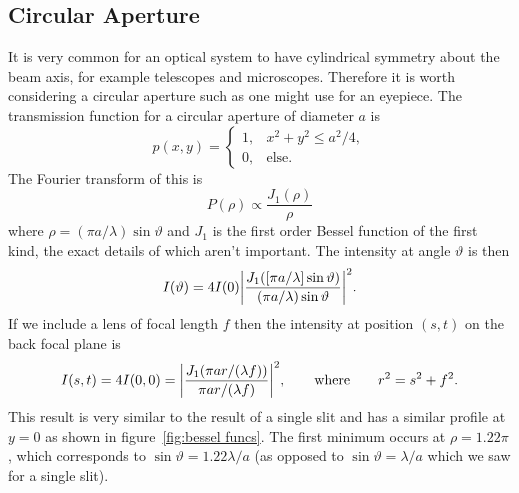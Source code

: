 \documentclass[a4paper]{article}
\begin{document}
    \subsection{Circular Aperture}
    It is very common for an optical system to have cylindrical symmetry about the beam axis, for example telescopes and microscopes.
    Therefore it is worth considering a circular aperture such as one might use for an eyepiece.
    The transmission function for a circular aperture of diameter \(a\) is
    \[
        p(x, y) =
        \begin{cases}
            1, & x^2 + y^2 \le a^2/4,\\
            0, & \text{else.}
        \end{cases}
    \]
    The Fourier transform of this is
    \[P(\rho) \propto \frac{J_1(\rho)}{\rho}\]
    where \(\rho = (\pi a/\lambda)\sin\vartheta\) and \(J_1\) is the first order Bessel function of the first kind, the exact details of which aren't important.
    The intensity at angle \(\vartheta\) is then
    \[I(\vartheta) = 4I(0) \abs{\frac{J_1([\pi a/\lambda]\sin\vartheta)}{(\pi a/\lambda)\sin\vartheta}}^2.\]
    If we include a lens of focal length \(f\) then the intensity at position \((s, t)\) on the back focal plane is
    \[I(s, t) = 4I(0, 0) = \abs{\frac{J_1(\pi ar/(\lambda f))}{\pi ar/(\lambda f)}}^2, \qquad\text{where}\qquad r^2 = s^2 + f^2.\]
    This result is very similar to the result of a single slit and has a similar profile at \(y = 0\) as shown in figure~\ref{fig:bessel funcs}.
    The first minimum occurs at \(\rho = 1.22\pi\), which corresponds to \(\sin\vartheta = 1.22\lambda/a\) (as opposed to \(\sin\vartheta = \lambda/a\) which we saw for a single slit).
    
\end{document}
